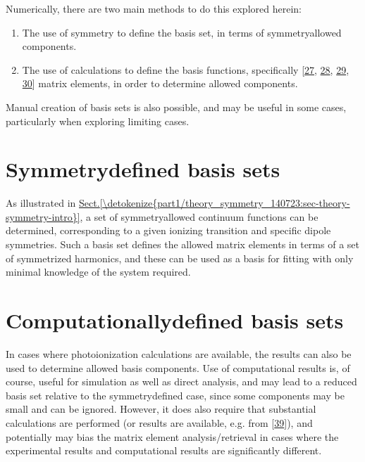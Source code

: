 \documentclass[letterpaper,table,10pt,english]{jupyterBook}
\begin{document}
\sphinxAtStartPar
Numerically, there are two main methods to do this explored herein:
\begin{enumerate}
%
\item {} 
\sphinxAtStartPar
The use of symmetry to define the basis set, in terms of symmetry\sphinxhyphen{}allowed components.

\item {} 
\sphinxAtStartPar
The use of  calculations to define the basis functions, specifically  {[}\hyperlink{cite.backmatter/bibliography:id747}{27}, \hyperlink{cite.backmatter/bibliography:id617}{28}, \hyperlink{cite.backmatter/bibliography:id786}{29}, \hyperlink{cite.backmatter/bibliography:id750}{30}{]} matrix elements, in order to determine allowed components.

\end{enumerate}

\sphinxAtStartPar
Manual creation of basis sets is also possible, and may be useful in some cases, particularly when exploring limiting cases.


\section{Symmetry\sphinxhyphen{}defined basis sets}
\label{\detokenize{part2/sym-fitting-intro_220423:symmetry-defined-basis-sets}}
\sphinxAtStartPar
As illustrated in \hyperref[\detokenize{part1/theory_symmetry_140723:sec-theory-symmetry-intro}]{Sect.\@ \ref{\detokenize{part1/theory_symmetry_140723:sec-theory-symmetry-intro}}}, a set of symmetry\sphinxhyphen{}allowed continuum functions can be determined, corresponding to a given ionizing transition and specific dipole symmetries. Such a basis set defines the allowed matrix elements in terms of a set of symmetrized harmonics, and these can be used as a basis for fitting with only minimal knowledge of the system required.


\section{Computationally\sphinxhyphen{}defined basis sets}
\label{\detokenize{part2/sym-fitting-intro_220423:computationally-defined-basis-sets}}
\sphinxAtStartPar
In cases where photoionization calculations are available, the results can also be used to determine allowed basis components. Use of  computational results is, of course, useful for simulation as well as direct analysis, and may lead to a reduced basis set relative to the symmetry\sphinxhyphen{}defined case, since some components may be small and can be ignored. However, it does also require that substantial calculations are performed (or results are available, e.g. from  {[}\hyperlink{cite.backmatter/bibliography:id665}{39}{]}), and \sphinxhyphen{} potentially \sphinxhyphen{} may bias the matrix element analysis/retrieval in cases where the experimental results and computational results are significantly different.
\end{document}
